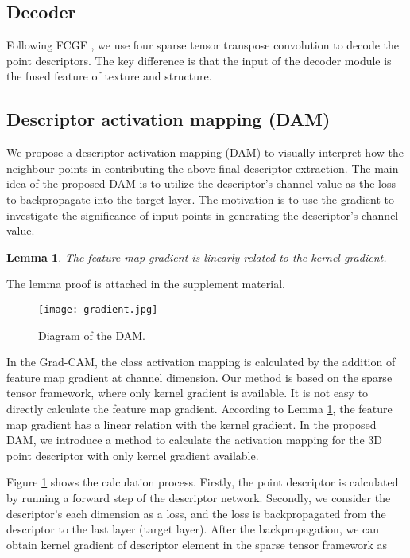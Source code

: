 \documentclass[10pt,twocolumn,letterpaper]{article}
\newtheorem{lemma}{Lemma}
\begin{document}
\subsection{Decoder} 
Following FCGF \cite{choy2019fully}, we use four sparse tensor transpose convolution to decode the point descriptors. The key difference is that the input of the decoder module is the fused feature of texture and structure. 

\subsection{Descriptor activation mapping (DAM)}   
We propose a descriptor activation mapping (DAM) to visually interpret how the neighbour points in contributing the above final descriptor extraction. The main idea of the proposed DAM is to utilize the descriptor's channel value as the loss to backpropagate into the target layer. The motivation is to use the gradient to investigate the significance of input points in generating the descriptor's channel value.

\begin{lemma}
	The feature map gradient is linearly related to the kernel gradient.
	\label{lemma1}
\end{lemma}
The lemma proof is attached in the supplement material.

\begin{figure}[htp]
	\centering
	\texttt{[image: gradient.jpg]}
	\caption{Diagram of the DAM. }
	\label{fig:3}
\end{figure}
In the Grad-CAM\cite{selvaraju2017grad}, the class activation mapping is calculated by the addition of feature map gradient at channel dimension. Our method is based on the sparse tensor framework, where only kernel gradient is available. It is not easy to directly calculate the feature map gradient.
According to Lemma \ref{lemma1}, the feature map gradient has a linear relation with the kernel gradient. In the proposed DAM, we introduce a method to calculate the activation mapping for the 3D point descriptor with only kernel gradient available. 

Figure \ref{fig:3} shows the calculation process. Firstly, the point descriptor  is calculated by running a forward step of the descriptor network. Secondly, we consider the descriptor's each dimension as a loss, and the loss is backpropagated from the descriptor to the last layer (target layer). After the backpropagation, we can obtain kernel gradient of  descriptor element  in the sparse tensor framework as
\end{document}
